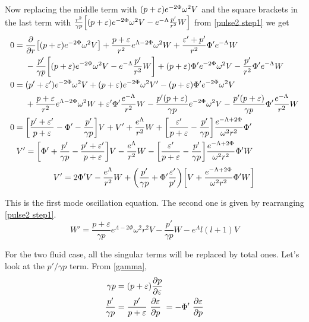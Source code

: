 \documentclass[12pt, letterpaper]{report}
\begin{document}
Now replacing the middle term with $\qty(p+\varepsilon)e^{-2\Phi}\omega^2{V}$ and the square brackets in the last term with $\frac{r^2}{\gamma p}\qty[\qty(p+\varepsilon)e^{-2\Phi}\omega^2{V}- e^{-\Lambda}\frac{p'}{r^2}W]$ from \cref{pulse2 step1} we get
\begin{align*}
    0={}& \pdv{}{r}\qty[\qty(p+\varepsilon)e^{-2\Phi}\omega^2{V}]+\frac{p+\varepsilon}{r^2}e^{\Lambda-2\Phi}\omega^2{W}+ \frac{\varepsilon'+p'}{r^2}\Phi' e^{-\Lambda}{W}\\
    &-\frac{p'}{\gamma p}\qty[\qty(p+\varepsilon)e^{-2\Phi}\omega^2{V}- e^{-\Lambda}\frac{p'}{r^2}W]+ \qty(p+\varepsilon)\Phi'e^{-2\Phi}\omega^2{V}- \frac{p'}{r^2}\Phi'e^{-\Lambda}W \\
    0={}& (p'+\varepsilon')e^{-2\Phi}\omega^2{V}+ (p+\varepsilon)e^{-2\Phi}\omega^2{V'}-\qty(p+\varepsilon)\Phi' e^{-2\Phi}\omega^2{V}\\
    &+\frac{p+\varepsilon}{r^2}e^{\Lambda-2\Phi}\omega^2{W}+{\varepsilon'}\Phi' \frac{e^{-\Lambda}}{r^2}{W} -\frac{p'\qty(p+\varepsilon)}{\gamma p}e^{-2\Phi}\omega^2{V}- \frac{p'\qty(p+\varepsilon)}{\gamma p}{\Phi'}\frac{e^{-\Lambda}}{r^2}W\\
    0={}& \qty[\frac{p'+\varepsilon'}{p+\varepsilon} -\Phi'-\frac{p'}{\gamma p}]{V}+ {V'}+\frac{e^{\Lambda}}{r^2}{W} + \qty[\frac{\varepsilon'}{p+\varepsilon} - \frac{p'}{\gamma p}]\frac{e^{-\Lambda+2\Phi}}{\omega^2 r^2}{\Phi'}\\
    V'&= \qty[\Phi'+\frac{p'}{\gamma p}-\frac{p'+\varepsilon'}{p+\varepsilon} ]{V}-\frac{e^{\Lambda}}{r^2}{W} - \qty[\frac{\varepsilon'}{p+\varepsilon} - \frac{p'}{\gamma p}]\frac{e^{-\Lambda+2\Phi}}{\omega^2 r^2}{\Phi'}W
\end{align*}
\begin{equation}
V'= 2\Phi'V -\frac{e^{\Lambda}}{r^2}{W}+ \qty(\frac{p'}{\gamma p}+\Phi' \frac{\varepsilon'}{p'})\qty[V+\frac{e^{-\Lambda+2\Phi}}{\omega^2 r^2}{\Phi'}W] \label{dV step 1}
\end{equation}

This is the first mode oscillation equation. The second one is given by rearranging \cref{pulse2 step1}. 
\begin{equation}
    W'= \frac{ p+\varepsilon}{ \gamma p }e^{\Lambda-2\Phi}\omega^2 r^2 V- \frac{p'}{\gamma p}W- e^\Lambda l(l+1)V\label{dW step 1}
\end{equation}

For the two fluid case, all the singular terms will be replaced by total ones. Let's look at the $p'/\gamma p$ term. From \cref{gamma}, 
\begin{align*}
    \gamma p &= \qty(p+\varepsilon)\pdv{p}{\varepsilon}\\
    \frac{p'}{\gamma p}&= \frac{p'}{p+\varepsilon}\ \pdv{\varepsilon}{p}\ = -\Phi'\ \pdv{\varepsilon}{p}
\end{align*}
\end{document}
